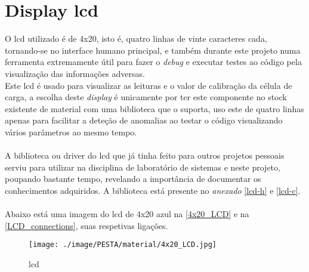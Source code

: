 \section{Display \acs{lcd}}
O \ac{lcd} utilizado é de 4x20, isto é, quatro linhas de vinte caracteres cada, tornando-se no interface humano principal, e também durante este projeto numa ferramenta extremamente útil para fazer o \textit{debug} e executar testes ao código pela visualização das informações adversas.\\
Este \acs{lcd} é usado para visualizar as leituras e o valor de calibração da célula de carga, a escolha deste \textit{display} é unicamente por ter este componente no stock existente de material com uma biblioteca que o suporta, uso este de quatro linhas apenas para facilitar a deteção de anomalias ao testar o código visualizando vários parâmetros ao mesmo tempo.
\\
\\
A biblioteca ou driver do \acs{lcd} que já tinha feito para outros projetos pessoais serviu para utilizar na disciplina de laboratório de sistemas \cite{article-1} e neste projeto, poupando bastante tempo, revelando a importância de documentar os conhecimentos adquiridos. A biblioteca está presente no \textit{anexado} \ref{lcd-h} e \ref{lcd-c}.
\\
\\
Abaixo está uma imagem do \acs{lcd} de 4x20 azul na \autoref{4x20_LCD} e na \autoref{LCD_connections}, suas respetivas ligações.
\\
\begin{figure}[H]
	\centering
	\texttt{[image: ./image/PESTA/material/4x20\_LCD.jpg]}
	\caption{\acs{lcd}}
	\label{4x20_LCD}
\end{figure}
